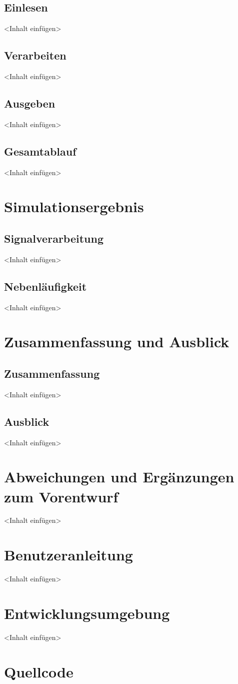 \documentclass[a4paper,12pt]{report}
\begin{document}
\section{Einlesen}
<Inhalt einfügen>

\section{Verarbeiten}
<Inhalt einfügen>

\section{Ausgeben}
<Inhalt einfügen>

\section{Gesamtablauf}
<Inhalt einfügen>

\chapter{Simulationsergebnis}
\section{Signalverarbeitung}
<Inhalt einfügen>

\section{Nebenläufigkeit}
<Inhalt einfügen>

\chapter{Zusammenfassung und Ausblick}
\section{Zusammenfassung}
<Inhalt einfügen>

\section{Ausblick}
<Inhalt einfügen>

\appendix
\chapter{Abweichungen und Ergänzungen zum Vorentwurf}
<Inhalt einfügen>

\chapter{Benutzeranleitung}
<Inhalt einfügen>

\chapter{Entwicklungsumgebung}
<Inhalt einfügen>

\chapter{Quellcode}
%
\end{document}
